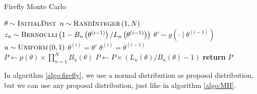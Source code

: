 \documentclass{article}
\theoremstyle{definition}
\begin{document}
\begin{algorithm}[H]
    \caption{Firefly Monte Carlo}
    \label{algo:firefly}
    \begin{algorithmic}[1] %
        \State $\theta \sim \textsc{InitialDist}$ 
        \State $n\sim \textsc{RandInteger}\left(1, N\right)$
        \State $z_n \sim \textsc{Bernoulli}\left(1 - B_n\left(\theta^{\left(i - 1\right)}\right)/L_n\left(\theta^{\left(i-1\right)}\right)\right) $
        \EndFor
        \State$\theta' \sim g\left(\cdot\mid\theta^{(i-1)}\right)$
        \State $u\sim \textsc{Uniform}\left(0,1\right)$
        \State $\theta^{\left(i\right)} = \theta'$
        \Else 
        \State $\theta^{\left(i\right)} = \theta^{\left(i-1\right)}$
         \EndIf
         \EndFor
         \\
            \State $P \gets p\left(\theta\right)\times \prod_{n=1}^N B_n\left(\theta\right)$
                \State $P\gets P \times \left(L_n\left(\theta\right)/B_n\left(\theta\right) - 1\right)$
                \EndFor
           \State \textbf{return} $P$
        \EndFunction
    \end{algorithmic}
\end{algorithm}
In algorithm \ref{algo:firefly}, we use a normal distribution as proposal distribution, but we can use any proposal distribution, just like in algorithm \ref{algo:MH}. 
\end{document}

